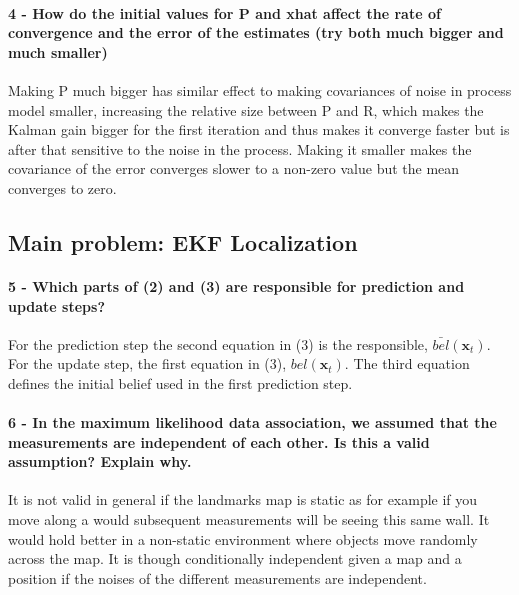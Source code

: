 \documentclass[12pt]{article}
\begin{document}
\paragraph{4 - How do the initial values for P and xhat affect the rate of convergence and the error of the estimates (try both much bigger and much smaller)}
Making P much bigger has similar effect to making covariances of noise in process model smaller, increasing the relative size between P and R, which makes the Kalman gain bigger for the first iteration and thus makes it converge faster but is after that sensitive to the noise in the process. Making it smaller makes the covariance of the error converges slower to a non-zero value but the mean converges to zero.

\subsection{Main problem: EKF Localization}

\paragraph{5 - Which parts of (2) and (3) are responsible for prediction and update steps?}
For the prediction step the second equation in (3) is the responsible, \(\bar{bel}(\textbf{x}_t)\). For the update step, the first equation in (3), \(bel(\textbf{x}_t)\). The third equation defines the initial belief used in the first prediction step.
	
\paragraph{6 - In the maximum likelihood data association, we assumed that the measurements are independent of each other. Is this a valid assumption? Explain why.}
It is not valid in general if the landmarks map is static as for example if you move along a would subsequent measurements will be seeing this same wall. It would hold better in a non-static environment where objects move randomly across the map. It is though conditionally independent given a map and a position if the noises of the different measurements are independent.
\end{document}

